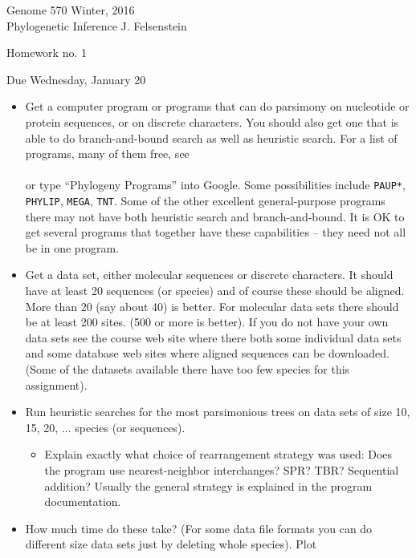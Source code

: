 \documentclass[12pt]{article}
\begin{document}
{\large
\noindent
Genome 570 \hfill Winter, 2016\\
Phylogenetic Inference \hfill J. Felsenstein\\
}

\vfill

\centerline{Homework no. 1}

\centerline{Due Wednesday, January 20}
\bigskip

\begin{itemize}
\item Get a computer program or programs that can do parsimony on nucleotide or protein
sequences, or on discrete characters.  You should also get one that is
able to do
branch-and-bound search as well as heuristic search.  For a list of programs,
many of them free, see\\
\hspace*{0in} \\
or type ``Phylogeny Programs'' into Google.  Some possibilities include
{\tt PAUP*}, {\tt PHYLIP}, {\tt MEGA}, {\tt TNT}.  Some of the other
excellent general-purpose programs there may not have both heuristic search
and branch-and-bound.   It is OK to get several programs that together have
these capabilities -- they need not all be in one program.
\item Get a data set, either molecular sequences or discrete characters.
It should have at least 20 sequences (or species) and of course these should
be aligned.  More than 20 (say about 40) is better.  For molecular data sets there should be at least 200 sites.
(500 or more is better). If you do not have your own data sets
see the course web site where there both some individual data sets and
some database web sites where aligned sequences can be downloaded.  (Some of
the datasets available there have too few species for this assignment).
\item Run heuristic searches for the most parsimonious trees on data sets of
size 10, 15, 20, ... species (or sequences).
\begin{itemize}
\item  Explain exactly what choice of rearrangement
strategy was used:  
Does the program use nearest-neighbor interchanges?
SPR? TBR? Sequential addition?  Usually the general strategy is explained in
the program documentation.
\end{itemize}
\item How much time do these take?  (For some data file formats
you can do different size data sets just by deleting whole species).  Plot

\end{itemize}
\end{document}
